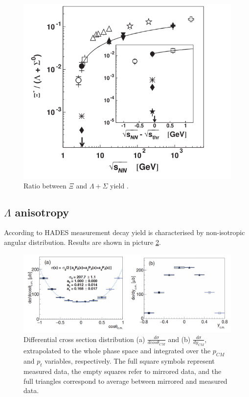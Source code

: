 \documentclass[12pt]{article}
\begin{document}
\begin{figure}[]
  \label{fig:ratio}
  \centering 
  \includegraphics[width=0.8 \textwidth] {../Images/Xi}
  \caption{Ratio between $\Xi$ and $\Lambda + \Sigma$ yield \cite{Ksi3.5}.}
\end{figure}

\subsection{$\Lambda$ anisotropy}
According to HADES measurement \cite{Lambda3.5} decay yield is characterised by non-isotropic angular distribution. Results are shown in picture \ref{fig:LambdaAng}.  
\begin{figure}[]
  \label{fig:LambdaAng}
  \centering 
  \includegraphics[width=0.8 \textwidth] {../Images/LambdaKat}
  \caption{Differential cross section distribution (a) $\frac{d\sigma}{d cos \theta_{CM}}$ and (b) $\frac{d\sigma}{d y_{CM}}$, extrapolated to the whole phase space and integrated over the $p_{CM}$ and $p_t$ variables, respectively. The full square symbols represent measured data, the empty squares refer to mirrored data, and the full triangles correspond to average between mirrored and measured data.}
\end{figure}
\end{document}
